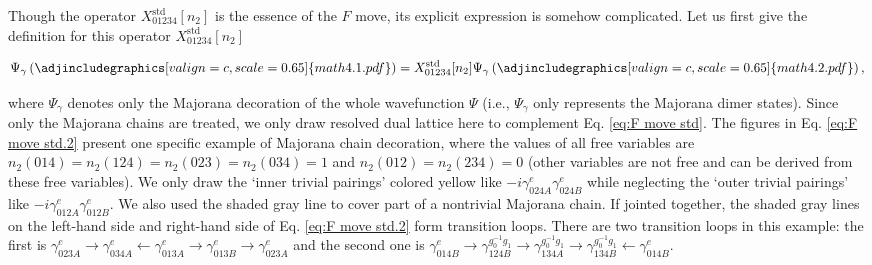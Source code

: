 \documentclass[%
 reprint,
 amsmath,amssymb,
 aps,
prb,
]{revtex4-2}
\begin{document}
Though the operator $X_{01234}^{\mathrm{std}}[ n_{2}]$ is the essence of the $F$ move, its explicit expression is somehow complicated.
Let us first give the definition for this operator $X_{01234}^{\mathrm{std}}[ n_{2}]$ 
\begin{widetext}
\begin{equation}
\Psi _\gamma \left( \adjincludegraphics[valign=c,scale=0.65]{math4.1.pdf} \right) = X_{01234}^{\mathrm{std}}[ n_{2}] \Psi _\gamma \left( \adjincludegraphics[valign=c,scale=0.65]{math4.2.pdf} \right) , \label{eq:F move std.2}
\end{equation}
\end{widetext}
where $\Psi _\gamma$ denotes only the Majorana decoration of the whole wavefunction $\Psi$ (i.e., $\Psi _\gamma$ only represents the Majorana dimer states).
Since only the Majorana chains are treated, we only draw resolved dual lattice here to complement Eq. \eqref{eq:F move std}.
The figures in Eq. \eqref{eq:F move std.2} present one specific example of Majorana chain decoration, where the values of all free variables are $n_2(014) = n_2(124) = n_2(023) = n_2(034) = 1$ and $n_2(012) = n_2(234) = 0$ (other variables are not free and can be derived from these free variables).
We only draw the `inner trivial pairings' colored yellow like $-i \gamma ^{e} _{024A} \gamma ^{e} _{024B}$ while neglecting the `outer trivial pairings' like $-i \gamma ^{e} _{012A} \gamma ^{e} _{012B}$.
We also used the shaded gray line to cover part of a nontrivial Majorana chain.
If jointed together, the shaded gray lines on the left-hand side and right-hand side of Eq. \eqref{eq:F move std.2} form transition loops.
There are two transition loops in this example: the first is $\gamma ^{e} _{023A} \rightarrow \gamma ^{e} _{034A} \leftarrow \gamma ^{e} _{013A} \rightarrow \gamma ^{e} _{013B} \rightarrow \gamma ^{e} _{023A}$ and the second one is $\gamma ^{e} _{014B} \rightarrow \gamma ^{g^{-1}_0 g_1} _{124B} \rightarrow \gamma ^{g^{-1}_0 g_1} _{134A} \rightarrow \gamma ^{g^{-1}_0 g_1} _{134B} \leftarrow \gamma ^{e} _{014B}$.
\end{document}

